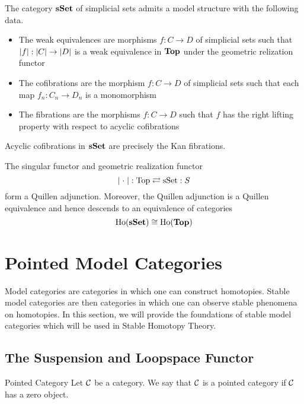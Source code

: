 \documentclass[a4paper]{article}
\begin{document}
\begin{thm}{}{} The category $\bold{sSet}$ of simplicial sets admits a model structure with the following data. 
\begin{itemize}
\item The weak equivalences are morphisms $f:C\to D$ of simplicial sets such that $\abs{f}:\abs{C}\to\abs{D}$ is a weak equivalence in $\bold{Top}$ under the geometric relization functor
\item The cofibrations are the morphism $f:C\to D$ of simplicial sets such that each map $f_n:C_n\to D_n$ is a monomorphism
\item The fibrations are the morphisms $f:C\to D$ such that $f$ has the right lifting property with respect to acyclic cofibrations
\end{itemize}
\end{thm}

\begin{lmm}{}{} Acyclic cofibrations in $\bold{sSet}$ are precisely the Kan fibrations. 
\end{lmm}

\begin{thm}{}{} The singular functor and geometric realization functor $$\abs{\;\cdot\;}:\text{Top}\rightleftarrows\text{sSet}:S$$ form a Quillen adjunction. Moreover, the Quillen adjunction is a Quillen equivalence and hence descends to an equivalence of categories $$\text{Ho}(\bold{sSet})\cong\text{Ho}(\bold{Top})$$
\end{thm}

\pagebreak
\section{Pointed Model Categories}
Model categories are categories in which one can construct homotopies. Stable model categories are then categories in which one can observe stable phenomena on homotopies. In this section, we will provide the foundations of stable model categories which will be used in Stable Homotopy Theory. 

\subsection{The Suspension and Loopspace Functor}
\begin{defn}{Pointed Category}{} Let $\mathcal{C}$ be a category. We say that $\mathcal{C}$ is a pointed category if $\mathcal{C}$ has a zero object. 
\end{defn}
\end{document}
